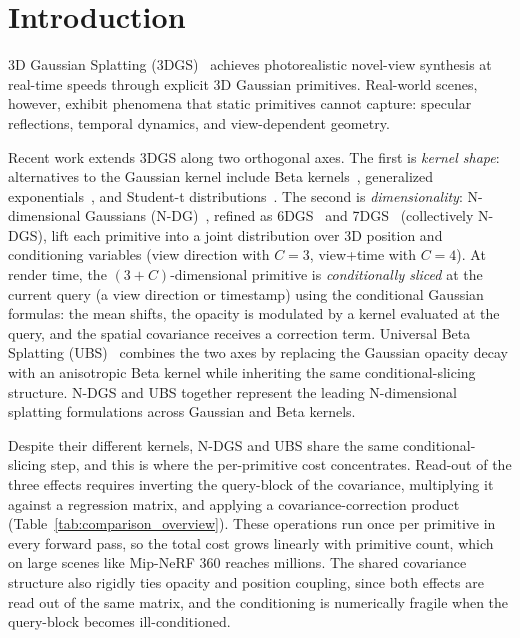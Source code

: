 \documentclass{article}
\theoremstyle{plain}
\theoremstyle{definition}
\theoremstyle{remark}
\begin{document}
\section{Introduction}
\label{sec:introduction}
3D Gaussian Splatting (3DGS)~\citep{3dgs} achieves photorealistic novel-view synthesis at real-time speeds through explicit 3D Gaussian primitives. Real-world scenes, however, exhibit phenomena that static primitives cannot capture: specular reflections, temporal dynamics, and view-dependent geometry.

Recent work extends 3DGS along two orthogonal axes. The first is \textit{kernel shape}: alternatives to the Gaussian kernel include Beta kernels~\citep{liu2025deformable,liu2025universal}, generalized exponentials~\citep{hamdi2024gesgeneralizedexponentialsplatting}, and Student-t distributions~\citep{zhu20253dstudentsplattingscooping}. The second is \textit{dimensionality}: N-dimensional Gaussians (N-DG)~\citep{diolatzis2024n}, refined as 6DGS~\citep{gao20246dgs} and 7DGS~\citep{gao20257dgs} (collectively N-DGS), lift each primitive into a joint distribution over 3D position and conditioning variables (view direction with $C{=}3$, view+time with $C{=}4$). At render time, the $(3{+}C)$-dimensional primitive is \textit{conditionally sliced} at the current query (a view direction or timestamp) using the conditional Gaussian formulas: the mean shifts, the opacity is modulated by a kernel evaluated at the query, and the spatial covariance receives a correction term. Universal Beta Splatting (UBS)~\citep{liu2025universal} combines the two axes by replacing the Gaussian opacity decay with an anisotropic Beta kernel while inheriting the same conditional-slicing structure. N-DGS and UBS together represent the leading N-dimensional splatting formulations across Gaussian and Beta kernels.

Despite their different kernels, N-DGS and UBS share the same conditional-slicing step, and this is where the per-primitive cost concentrates. Read-out of the three effects requires inverting the query-block of the covariance, multiplying it against a regression matrix, and applying a covariance-correction product (Table~\ref{tab:comparison_overview}). These operations run once per primitive in every forward pass, so the total cost grows linearly with primitive count, which on large scenes like Mip-NeRF 360 reaches millions. The shared covariance structure also rigidly ties opacity and position coupling, since both effects are read out of the same matrix, and the conditioning is numerically fragile when the query-block becomes ill-conditioned.
\end{document}
